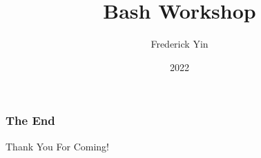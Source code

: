 \documentclass{beamer}
\title{Bash Workshop}
\author{Frederick Yin}
\institute{JITech}
\date{2022}
\begin{document}
\frame{\titlepage}




\begin{frame}
\frametitle{The End}
\vspace{1cm}
\centering \Huge {Thank You For Coming!}
\end{frame}
\end{document}
